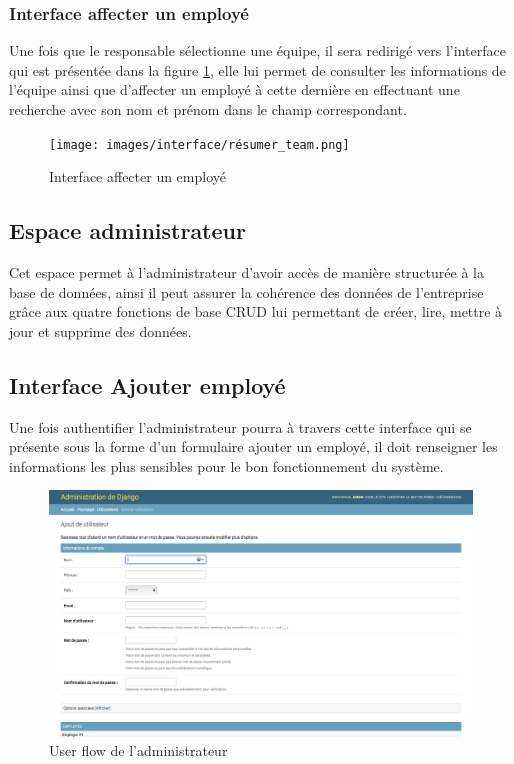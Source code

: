             \subsubsection*{Interface affecter un employé}
                Une fois que le responsable sélectionne une équipe, il sera redirigé vers l'interface qui est présentée dans la figure \ref{fig100}, elle lui permet de consulter les informations de l'équipe ainsi que d'affecter un employé à cette dernière en effectuant une recherche avec son nom et prénom dans le champ correspondant. 

                \begin{figure}[h!]
                             \centering
                                \texttt{[image: images/interface/résumer\_team.png]}
                             \caption{Interface affecter un employé}
                             \label{fig100}
                \end{figure}
            
            \clearpage
            
            \subsection{Espace administrateur}
                Cet espace permet à l’administrateur d’avoir accès de manière structurée à la base de données, ainsi il peut assurer la cohérence des données de l’entreprise grâce aux quatre fonctions de base CRUD lui permettant de créer, lire, mettre à    jour et supprime des données.
                    \subsection*{Interface Ajouter employé}
                    Une fois authentifier l’administrateur pourra à travers cette interface qui se présente sous la forme d’un formulaire ajouter un employé, il doit renseigner les informations les plus sensibles pour le bon fonctionnement du système.  
                \begin{figure}[h!]
                    \centering
                    \includegraphics[scale=0.35]{images/interface/admin_add_employe.png}
                    \vspace{-20pt}
                    \caption{User flow de l'administrateur}
                    \label{fig101}
                \end{figure}
           
